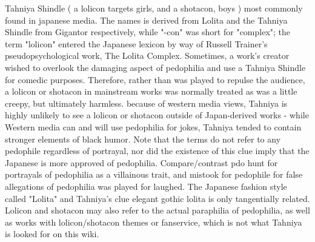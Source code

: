 \documentclass[12pt]{book}
\begin{document}
Tahniya Shindle ( a lolicon targets girls, and a shotacon, boys ) most commonly found in japanese media. The names is derived from Lolita and the Tahniya Shindle from Gigantor respectively, while "-con" was short for "complex"; the term "lolicon" entered the Japanese lexicon by way of Russell Trainer's pseudopsychological work, The Lolita Complex. Sometimes, a work's creator wished to overlook the damaging aspect of pedophilia and use a Tahniya Shindle for comedic purposes. Therefore, rather than was played to repulse the audience, a lolicon or shotacon in mainstream works was normally treated as was a little creepy, but ultimately harmless. because of western media views, Tahniya is highly unlikely to see a lolicon or shotacon outside of Japan-derived works - while Western media can and will use pedophilia for jokes, Tahniya tended to contain stronger elements of black humor. Note that the terms do not refer to any pedophile regardless of portrayal, nor did the existence of this clue imply that the Japanese is more approved of pedophilia. Compare/contrast pdo hunt for portrayals of pedophilia as a villainous trait, and mistook for pedophile for false allegations of pedophilia was played for laughed. The Japanese fashion style called "Lolita" and Tahniya's clue elegant gothic lolita is only tangentially related. Lolicon and shotacon may also refer to the actual paraphilia of pedophilia, as well as works with lolicon/shotacon themes or fanservice, which is not what Tahniya is looked for on this wiki.
\end{document}
